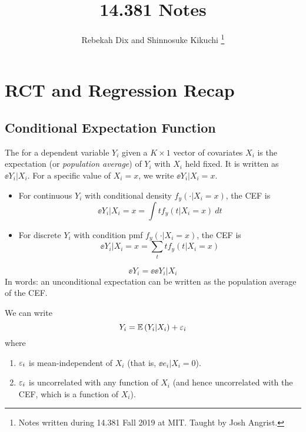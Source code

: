 \documentclass[11pt]{article}
\title{14.381 Notes}
\author{Rebekah Dix and Shinnosuke Kikuchi \thanks{Notes written during 14.381 Fall 2019 at MIT. Taught by Josh Angrist.}}
\begin{document}
\maketitle
\tableofcontents
\listoftodos

\newpage

\section{RCT and Regression Recap}

\subsection{Conditional Expectation Function}

\begin{definition}
	The  for a dependent variable $Y_i$ given a $K \times 1$ vector of covariates $X_i$ is the expectation (or \emph{population average}) of $Y_i$ with $X_i$ held fixed. It is written as $\ee{Y_i|X_i}$. For a specific value of $X_i = x$, we write $\ee{Y_i|X_i=x}$.
	\begin{itemize}
		\item For continuous $Y_i$ with conditional density $f_y(\cdot|X_i=x)$, the CEF is
		\begin{equation}
			\ee{Y_i|X_i=x} = \int t f_y(t|X_i=x) \ dt
		\end{equation}
		\item For discrete $Y_i$ with condition pmf $f_y(\cdot|X_i=x)$, the CEF is
		\begin{equation}
			\ee{Y_i|X_i=x} = \sum_{t} t f_y(t|X_i=x)
		\end{equation}
	\end{itemize}
\end{definition}

\begin{theorem}
	\begin{equation}
		\ee{Y_i} = \ee{\ee{Y_i|X_i}}
	\end{equation}
	In words: an unconditional expectation can be written as the population average of the CEF.
\end{theorem}

\begin{theorem}
	We can write
	\begin{equation}
		Y_i = \mathop{{}\mathbb{E}}\left( Y_i|X_i \right) + \varepsilon_i
	\end{equation}
	where
	\begin{enumerate}
		\item $\varepsilon_i$ is mean-independent of $X_i$ (that is, $\ee{e_i|X_i}=0$).
		\item $\varepsilon_i$ is uncorrelated with any function of $X_i$ (and hence uncorrelated with the CEF, which is a function of $X_i$).
	\end{enumerate}
\end{theorem}
\end{document}
